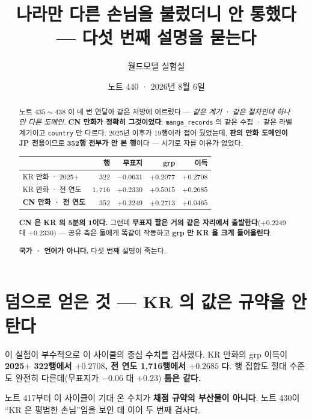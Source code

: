 \documentclass[11pt]{article}
\begin{document}
\title{나라만 다른 손님을 불렀더니 안 통했다 --- 다섯 번째 설명을 묻는다}
\author{월드모델 실험실}
\date{노트 440 · 2026년 8월 6일}
\maketitle

\begin{abstract}
노트 $435 \sim 438$ 이 네 번 연달아 같은 처방에 이르렀다 --- \emph{같은 계기 ·
같은 절차인데 하나만 다른 도메인.} \textbf{CN 만화가 정확히 그것이었다}:
\texttt{manga\_records} 의 같은 수집 · 같은 라벨 계기이고 \texttt{country} 만
다르다. 2025년 이후가 19행이라 접어 뒀었는데, \textbf{판의 만화 도메인이
JP 전용}이므로 \textbf{352행 전부가 안 본 행}이다 --- 시기로 자를 이유가
없었다.

\begin{center}
\begin{tabular}{lrrrr}
\hline
 & 행 & 무표지 & grp & 이득 \\
\hline
KR 만화 · 2025$+$ & $322$ & $-0.0631$ & $+0.2077$ & $\mathbf{+0.2708}$ \\
KR 만화 · 전 연도 & $1{,}716$ & $+0.2330$ & $+0.5015$ & $\mathbf{+0.2685}$ \\
\textbf{CN 만화 · 전 연도} & $352$ & $+0.2249$ & $+0.2713$ & $\mathbf{+0.0465}$ \\
\hline
\end{tabular}
\end{center}

\textbf{CN 은 KR 의 5분의 1이다.} 그런데 \textbf{무표지 팔은 거의 같은
자리에서 출발한다}($+0.2249$ 대 $+0.2330$) --- 공유 축은 둘에게 똑같이
작동하고 \textbf{grp 만 KR 을 크게 들어올린다}.

\textbf{국가 · 언어가 아니다.} 다섯 번째 설명이 죽는다.
\end{abstract}

\section{덤으로 얻은 것 --- KR 의 값은 규약을 안 탄다}

이 실험이 부수적으로 이 사이클의 중심 수치를 검사했다. KR 만화의 grp 이득이
\textbf{2025$+$ 322행에서 $+0.2708$, 전 연도 1{,}716행에서 $+0.2685$} 다.
행 집합도 절대 수준도 완전히 다른데(무표지가 $-0.06$ 대 $+0.23$) \textbf{틈은
같다.}

노트 417부터 이 사이클이 기대 온 수치가 \textbf{채점 규약의 부산물이
아니다}. 노트 430이 ``KR 은 평범한 손님''임을 보인 데 이어 두 번째 검사다.
\end{document}
